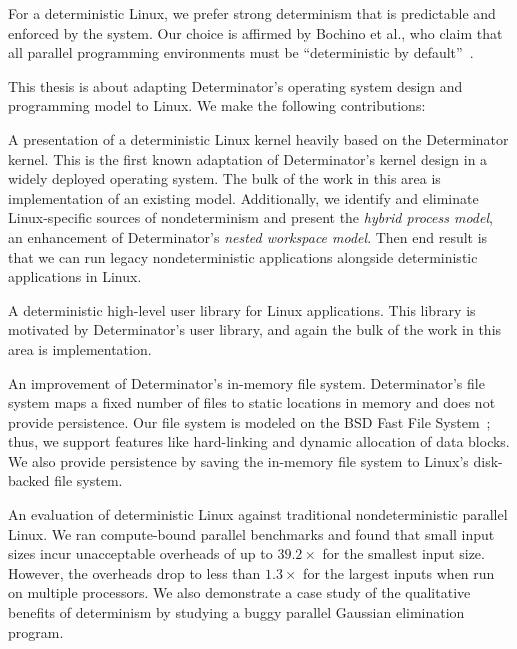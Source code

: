 For a deterministic Linux, we prefer strong determinism
that is predictable and enforced by the system. Our choice is
affirmed by Bochino et al., who claim that all parallel programming environments
must be ``deterministic by default''~\cite{bocchino2009parallel}.
\fi

This thesis is about adapting Determinator's operating system design and
programming model to Linux. We make the following contributions:
\begin{myitemize4}
    \item A presentation of a deterministic Linux kernel heavily based on
    the Determinator kernel. This is the first known adaptation of
    Determinator's kernel design in a widely deployed operating system.
    The bulk of the work in this area is implementation of an existing model.
    Additionally, we identify and eliminate Linux-specific sources of
    nondeterminism and present the \emph{hybrid process model}, an
    enhancement of Determinator's \emph{nested workspace model}. Then end
    result is that we can run legacy nondeterministic applications alongside
    deterministic applications in Linux.
    \item A deterministic high-level user library for Linux applications.
    This library is motivated by Determinator's user library, and
    again the bulk of the work in this area is implementation.
    \item An improvement of Determinator's in-memory file system.
    Determinator's file system maps a fixed number of files to static locations
    in memory and does not provide persistence. Our file system is modeled on
    the BSD Fast File System~\cite{mckusick1984fast}; thus, we support features
    like hard-linking and dynamic allocation of data blocks. We also provide
    persistence by saving the in-memory file system to Linux's disk-backed file
    system.
    \item An evaluation of deterministic Linux against traditional
    nondeterministic parallel Linux. We ran compute-bound parallel benchmarks
    and found that small input sizes incur unacceptable overheads of up to
    $39.2\times$ for the smallest input size. However, the overheads drop to
    less than $1.3\times$ for the largest inputs when run on multiple
    processors. We also demonstrate a case study of the qualitative benefits of
    determinism by studying a buggy parallel Gaussian elimination program.
\end{myitemize4}

\iffalse


